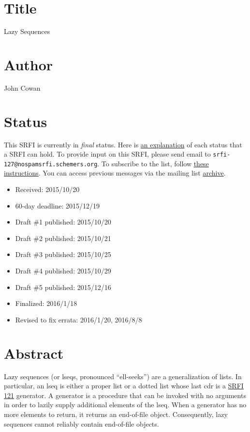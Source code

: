 \section{Title}\label{title}

Lazy Sequences

\section{Author}\label{author}

John Cowan

\section{Status}\label{status}

This SRFI is currently in \emph{final} status. Here is
\href{http://srfi.schemers.org/srfi-process.html}{an explanation} of
each status that a SRFI can hold. To provide input on this SRFI, please
send email to \texttt{srfi-127@nospamsrfi.schemers.org}. To subscribe to
the list, follow
\href{http://srfi.schemers.org/srfi-list-subscribe.html}{these
instructions}. You can access previous messages via the mailing list
\href{http://srfi-email.schemers.org/srfi-127}{archive}.

\begin{itemize}
\tightlist
\item
  Received: 2015/10/20
\item
  60-day deadline: 2015/12/19
\item
  Draft \#1 published: 2015/10/20
\item
  Draft \#2 published: 2015/10/21
\item
  Draft \#3 published: 2015/10/25
\item
  Draft \#4 published: 2015/10/29
\item
  Draft \#5 published: 2015/12/16
\item
  Finalized: 2016/1/18
\item
  Revised to fix errata: 2016/1/20, 2016/8/8
\end{itemize}

\section{Abstract}\label{abstract}

Lazy sequences (or lseqs, pronounced ``ell-seeks'') are a generalization
of lists. In particular, an lseq is either a proper list or a dotted
list whose last cdr is a
\href{http://srfi.schemers.org/srfi-121/srfi-121.html}{SRFI 121}
generator. A generator is a procedure that can be invoked with no
arguments in order to lazily supply additional elements of the lseq.
When a generator has no more elements to return, it returns an
end-of-file object. Consequently, lazy sequences cannot reliably contain
end-of-file objects.


